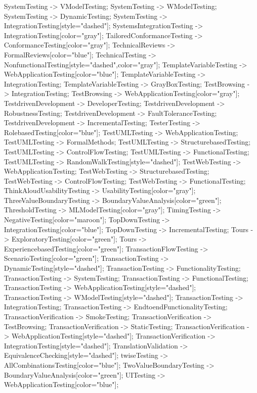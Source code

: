 \documentclass{article}
\begin{document}
{SystemTesting -> VModelTesting;
SystemTesting -> WModelTesting;
SystemTesting -> DynamicTesting;
SystemTesting -> IntegrationTesting[style="dashed"];
SystemsIntegrationTesting -> IntegrationTesting[color="gray"];
TailoredConformanceTesting -> ConformanceTesting[color="gray"];
TechnicalReviews -> FormalReviews[color="blue"];
TechnicalTesting -> NonfunctionalTesting[style="dashed",color="gray"];
TemplateVariableTesting -> WebApplicationTesting[color="blue"];
TemplateVariableTesting -> IntegrationTesting;
TemplateVariableTesting -> GrayBoxTesting;
TestBrowsing -> IntegrationTesting;
TestBrowsing -> WebApplicationTesting[color="gray"];
TestdrivenDevelopment -> DeveloperTesting;
TestdrivenDevelopment -> RobustnessTesting;
TestdrivenDevelopment -> FaultToleranceTesting;
TestdrivenDevelopment -> IncrementalTesting;
TesterTesting -> RolebasedTesting[color="blue"];
TestUMLTesting -> WebApplicationTesting;
TestUMLTesting -> FormalMethods;
TestUMLTesting -> StructurebasedTesting;
TestUMLTesting -> ControlFlowTesting;
TestUMLTesting -> FunctionalTesting;
TestUMLTesting -> RandomWalkTesting[style="dashed"];
TestWebTesting -> WebApplicationTesting;
TestWebTesting -> StructurebasedTesting;
TestWebTesting -> ControlFlowTesting;
TestWebTesting -> FunctionalTesting;
ThinkAloudUsabilityTesting -> UsabilityTesting[color="gray"];
ThreeValueBoundaryTesting -> BoundaryValueAnalysis[color="green"];
ThresholdTesting -> MLModelTesting[color="gray"];
TimingTesting -> NegativeTesting[color="maroon"];
TopDownTesting -> IntegrationTesting[color="blue"];
TopDownTesting -> IncrementalTesting;
Tours -> ExploratoryTesting[color="green"];
Tours -> ExperiencebasedTesting[color="green"];
TransactionFlowTesting -> ScenarioTesting[color="green"];
TransactionTesting -> DynamicTesting[style="dashed"];
TransactionTesting -> FunctionalityTesting;
TransactionTesting -> SystemTesting;
TransactionTesting -> FunctionalTesting;
TransactionTesting -> WebApplicationTesting[style="dashed"];
TransactionTesting -> WModelTesting[style="dashed"];
TransactionTesting -> IntegrationTesting;
TransactionTesting -> EndtoendFunctionalityTesting;
TransactionVerification -> SmokeTesting;
TransactionVerification -> TestBrowsing;
TransactionVerification -> StaticTesting;
TransactionVerification -> WebApplicationTesting[style="dashed"];
TransactionVerification -> IntegrationTesting[style="dashed"];
TranslationValidation -> EquivalenceChecking[style="dashed"];
twiseTesting -> AllCombinationsTesting[color="blue"];
TwoValueBoundaryTesting -> BoundaryValueAnalysis[color="green"];
UITesting -> WebApplicationTesting[color="blue"];
}
\end{document}
